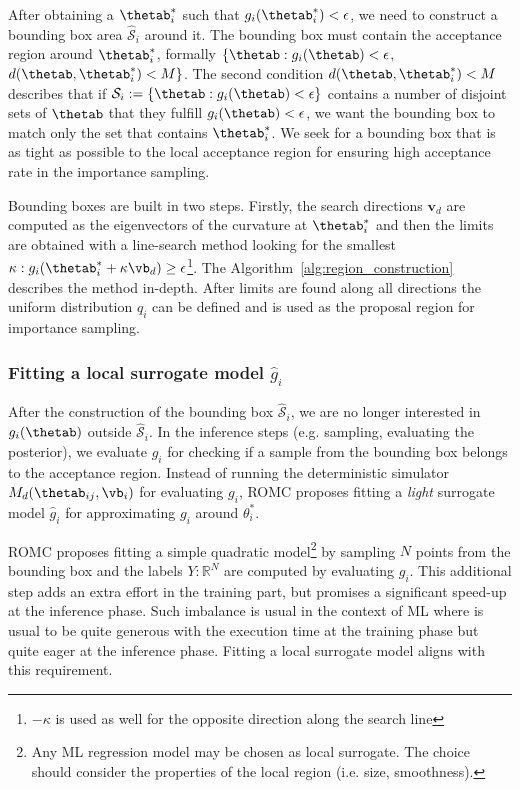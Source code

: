 After obtaining a $\thetab_i^*$ such that
$g_i(\thetab_i^*) < \epsilon$, we need to construct a bounding box
area $\mathcal{\hat{S}}_i$ around it. The bounding box must contain
the acceptance region around $\thetab_i^*$, formally
$\{ \thetab : g_i(\thetab) < \epsilon$,
$d(\thetab, \thetab_i^*) < M \}$. The second condition
$d(\thetab, \thetab_i^*) < M$ describes that if
$\mathcal{S}_i := \{ \thetab : g_i(\thetab) < \epsilon \} $ contains a
number of disjoint sets of $\thetab$ that they fulfill
$g_i(\thetab) < \epsilon$, we want the bounding box to match only the
set that contains $\thetab_i^*$. We seek for a bounding box that is as
tight as possible to the local acceptance region for ensuring high
acceptance rate in the importance sampling.

Bounding boxes are built in two steps. Firstly, the search directions
$\mathbf{v}_d$ are computed as the eigenvectors of the curvature at
$\thetab_i^*$ and then the limits are obtained with a line-search
method looking for the smallest
$\kappa: g_i(\thetab_i^* + \kappa \vb_d) \geq
\epsilon$\footnote{$-\kappa$ is used as well for the opposite
  direction along the search line}. The
Algorithm~\ref{alg:region_construction} describes the method
in-depth. After limits are found along all directions the uniform
distribution $q_i$ can be defined and is used as the proposal region
for importance sampling.


\subsubsection*{Fitting a local surrogate model $\hat{g}_i$}

After the construction of the bounding box $\mathcal{\hat{S}}_i$, we
are no longer interested in $g_i(\thetab)$ outside
$\mathcal{\hat{S}}_i$. In the inference steps (e.g. sampling,
evaluating the posterior), we evaluate $g_i$ for checking if a sample
from the bounding box belongs to the acceptance region. Instead of
running the deterministic simulator $M_d(\thetab_{ij}, \vb_i)$ for
evaluating $g_i$, ROMC proposes fitting a \emph{light} surrogate model
$\hat{g}_i$ for approximating $g_i$ around $\theta_i^*$.

ROMC proposes fitting a simple quadratic model\footnote{Any ML
  regression model may be chosen as local surrogate. The choice should
  consider the properties of the local region (i.e. size,
  smoothness). } by sampling $N$ points from the bounding box and the
labels $Y: \mathbb{R}^{N}$ are computed by evaluating $g_i$. This
additional step adds an extra effort in the training part, but
promises a significant speed-up at the inference phase. Such imbalance
is usual in the context of ML where is usual to be quite generous with
the execution time at the training phase but quite eager at the
inference phase. Fitting a local surrogate model aligns with this
requirement.

